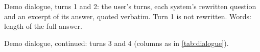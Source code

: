 \documentclass{article}
\begin{document}
\begin{table}[!ht]
\caption{Demo dialogue, turns 1 and 2: the user's turns, each system's rewritten question and an excerpt of
its answer, quoted verbatim. Turn 1 is not rewritten. Words: length of the full answer.}
\label{tab:dialogue}
\vskip 0.05in
\begin{center}\begin{footnotesize}

\end{footnotesize}\end{center}
\end{table}

\begin{table}[!t]
\caption{Demo dialogue, continued: turns 3 and 4 (columns as in \cref{tab:dialogue}).}
\label{tab:dialogue2}
\vskip 0.05in
\begin{center}\begin{footnotesize}

\end{footnotesize}\end{center}
\end{table}
\end{document}
